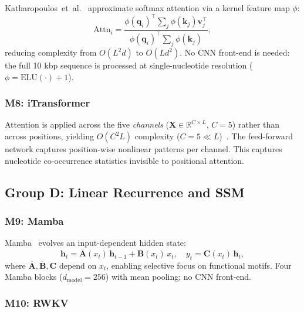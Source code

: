 Katharopoulos~et~al.~\cite{linear_transformer} approximate softmax attention via a
kernel feature map $\phi$:
\begin{equation}
  \mathrm{Attn}_i = \frac{\phi(\mathbf{q}_i)^\top
    \textstyle\sum_{j}\phi(\mathbf{k}_j)\mathbf{v}_j^\top}
  {\phi(\mathbf{q}_i)^\top\sum_{j}\phi(\mathbf{k}_j)},
\end{equation}
reducing complexity from $O(L^2 d)$ to $O(Ld^2)$.
No CNN front-end is needed: the full 10 kbp sequence is processed at
single-nucleotide resolution ($\phi = \mathrm{ELU}(\cdot)+1$).

\subsubsection{M8: iTransformer}

Attention is applied across the five \emph{channels}
($\mathbf{X} \in \mathbb{R}^{C \times L}$, $C = 5$) rather than across positions,
yielding $O(C^2 L)$ complexity ($C = 5 \ll L$)~\cite{itransformer}.
The feed-forward network captures position-wise nonlinear patterns per channel.
This captures nucleotide co-occurrence statistics invisible to positional attention.

\subsection{Group D: Linear Recurrence and SSM}

\subsubsection{M9: Mamba}

Mamba~\cite{mamba} evolves an input-dependent hidden state:
\begin{equation}
  \mathbf{h}_t = \overline{\mathbf{A}}(x_t)\,\mathbf{h}_{t-1}
               + \overline{\mathbf{B}}(x_t)\,x_t,\quad
  y_t = \mathbf{C}(x_t)\,\mathbf{h}_t,
\end{equation}
where $\overline{\mathbf{A}}, \overline{\mathbf{B}}, \mathbf{C}$ depend on $x_t$,
enabling selective focus on functional motifs.
Four Mamba blocks ($d_{\mathrm{model}} = 256$) with mean pooling; no CNN front-end.

\subsubsection{M10: RWKV}

